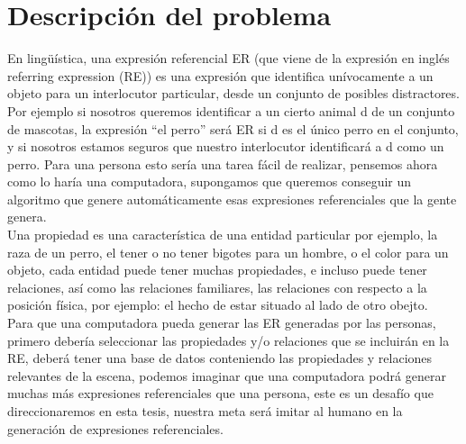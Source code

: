 
\section{Descripci\'on del problema}
\label{sec:intro}

En ling\"u\'{i}stica, una expresi\'on referencial ER (que viene de la expresi\'on en ingl\'es referring expression (RE)) es una expresi\'on que identifica un\'ivocamente a un objeto para un interlocutor particular, desde un conjunto de posibles distractores. Por ejemplo si nosotros queremos identificar a un cierto animal d de un conjunto de mascotas, la expresi\'on ``el perro'' ser\'a ER si d es el \'unico perro en el conjunto, y si nosotros estamos seguros que nuestro interlocutor identificar\'a a d como un perro. Para una persona esto ser\'ia una tarea f\'acil de realizar, pensemos ahora como lo har\'ia una computadora, supongamos que queremos conseguir un algoritmo que genere autom\'aticamente esas expresiones referenciales que la gente genera.\\

Una propiedad es una caracter\'istica de una entidad particular por ejemplo, la raza de un perro, el tener o no tener bigotes para un hombre, o el color para un objeto, cada entidad puede tener muchas propiedades, e incluso puede tener relaciones, as\'i como las relaciones familiares, las relaciones con respecto a la posici\'on f\'isica, por ejemplo: el hecho de estar situado al lado de otro obejto.\\

 Para que una computadora pueda generar las ER generadas por las personas, primero deber\'ia seleccionar las propiedades y/o relaciones que se incluir\'an en la RE, deber\'a tener una base de datos conteniendo las propiedades y relaciones relevantes de la escena, podemos imaginar que una computadora podr\'a generar muchas m\'as expresiones referenciales que una persona, este es un desaf\'io que direccionaremos en esta tesis, nuestra meta ser\'a imitar al humano en la generaci\'on de expresiones referenciales. \\


